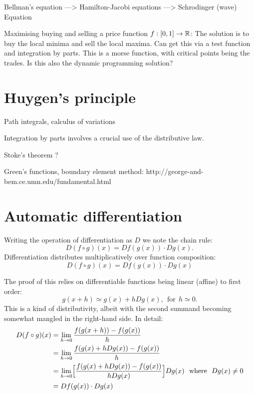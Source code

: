 \documentclass[11pt]{article}
\begin{document}
Bellman's equation ---> Hamilton-Jacobi equations ---> Schrodinger (wave) Equation


Maximising buying and selling a price function $f:[0,1]\to \mathbb R$:
    The solution is to buy the local minima and sell the
    local maxima. Can get this via a test function and
    integration by parts. This is a morse function, with
    critical points being the trades.
    Is this also the dynamic programming solution?

%
%

\section{Huygen's principle}

Path integrals, calculus of variations

Integration by parts involves a crucial use of the distributive law.

Stoke's theorem ? %

Green's functions,
boundary element method: http://george-and-bem.ce.umn.edu/fundamental.html


%
%

\section{Automatic differentiation}

Writing the operation of differentiation as $D$
we note the chain rule:
$$
    D(f\circ g)(x) = Df(g(x))\cdot Dg(x).
$$
Differentiation distributes
multiplicatively over function
composition:
$$
    D(f\circ g)(x) = Df(g(x))\cdot Dg(x)
$$

The proof of this relies on differentiable functions being linear (affine) to first order:
$$
    g(x+h) \simeq g(x) + hDg(x), \ \ \mbox{for}\ \ h \simeq 0.
$$
This is a kind of distributivity, albeit with the second summand becoming
somewhat mangled in the right-hand side.
In detail:
\begin{align*}
    D(f\circ g)(x)  &= \lim_{h\to 0} \frac{ f(g(x+h)) - f(g(x)) } {h}  \\
                    &= \lim_{h\to 0} \frac{ f(g(x) + hDg(x)) - f(g(x)) } {h}  \\
                    &= \lim_{h\to 0} \Bigl[\frac{ f(g(x) + hDg(x)) - f(g(x)) } {hDg(x)}\Bigr] Dg(x) \ \ \mbox{where}\ \  Dg(x)\ne 0\\
                    &= Df(g(x))\cdot Dg(x) \\
\end{align*}
\end{document}
